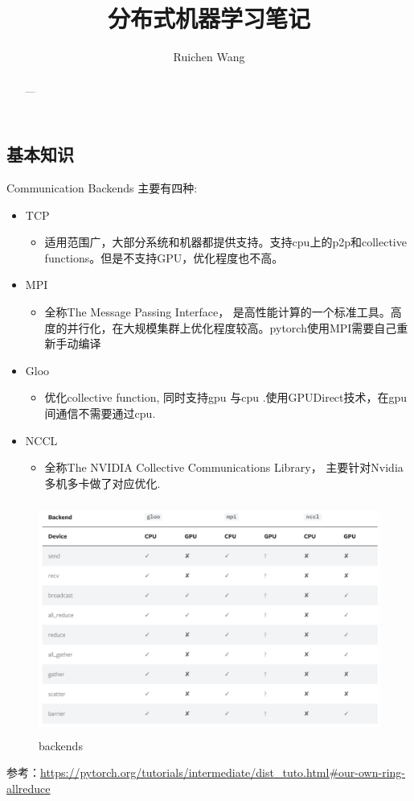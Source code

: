 \documentclass{article}
\title{分布式机器学习笔记}
\author{Ruichen Wang}
\begin{document}
\begin{CJK*}{UTF8}{gbsn}
\maketitle
\begin{abstract}
---
\end{abstract}

\tableofcontents
\section{基本知识}
Communication Backends 主要有四种:
\begin{itemize}
\item TCP 
\begin{itemize}
\item 适用范围广，大部分系统和机器都提供支持。支持cpu上的p2p和collective functions。但是不支持GPU，优化程度也不高。
\end{itemize}
\item MPI
\begin{itemize}
\item 全称The Message Passing Interface， 是高性能计算的一个标准工具。高度的并行化，在大规模集群上优化程度较高。pytorch使用MPI需要自己重新手动编译
\end{itemize}
\item Gloo
\begin{itemize}
\item 优化collective function, 同时支持gpu 与cpu .使用GPUDirect技术，在gpu间通信不需要通过cpu. 
\end{itemize}
\item NCCL
\begin{itemize}
\item 全称The NVIDIA Collective Communications Library， 主要针对Nvidia多机多卡做了对应优化.
\end{itemize}
\end{itemize}
\begin{figure}[H]
\centering
\includegraphics[width=5in,height=3in]{backends}
\caption{backends}
\end{figure}
参考：\url{https://pytorch.org/tutorials/intermediate/dist_tuto.html#our-own-ring-allreduce}

\end{CJK*}
\end{document}
